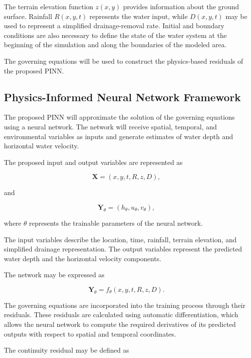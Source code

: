 The terrain elevation function $z(x,y)$ provides information about the ground surface. Rainfall $R(x,y,t)$ represents the water input, while $D(x,y,t)$ may be used to represent a simplified drainage-removal rate. Initial and boundary conditions are also necessary to define the state of the water system at the beginning of the simulation and along the boundaries of the modeled area.

The governing equations will be used to construct the physics-based residuals of the proposed PINN.

\subsection{Physics-Informed Neural Network Framework}


The proposed PINN will approximate the solution of the governing equations using a neural network. The network will receive spatial, temporal, and environmental variables as inputs and generate estimates of water depth and horizontal water velocity.

The proposed input and output variables are represented as

\[
\mathbf{X}=(x,y,t,R,z,D),
\]

and

\[
\mathbf{Y}_{\theta}=(h_{\theta},u_{\theta},v_{\theta}),
\]

where $\theta$ represents the trainable parameters of the neural network.

The input variables describe the location, time, rainfall, terrain elevation, and simplified drainage representation. The output variables represent the predicted water depth and the horizontal velocity components.

The network may be expressed as

\[
\mathbf{Y}_{\theta}
=
f_{\theta}(x,y,t,R,z,D).
\]

The governing equations are incorporated into the training process through their residuals. These residuals are calculated using automatic differentiation, which allows the neural network to compute the required derivatives of its predicted outputs with respect to spatial and temporal coordinates.

The continuity residual may be defined as

